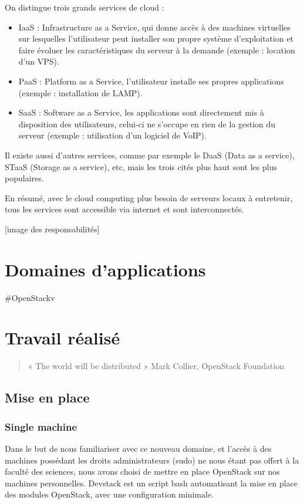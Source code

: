 \documentclass{report}
\begin{document}
    On distingue trois grands services de cloud :
    \begin{itemize}
        \item IaaS : Infrastructure as a Service, qui donne accès à des machines virtuelles sur lesquelles l'utilisateur peut installer son propre système d'exploitation et faire évoluer les caractéristiques du serveur à la demande (exemple : location d'un VPS).
        \item PaaS : Platform as a Service, l'utilisateur installe ses propres applications (exemple : installation de LAMP).
        \item SaaS : Software as a Service, les applications sont directement mis à disposition des utilisateurs, celui-ci ne s'occupe en rien de la gestion du serveur (exemple : utilisation d'un logiciel de VoIP).
    \end{itemize}
    \bigbreak
    
    Il existe aussi d'autres services, comme par exemple le DaaS (Data as a service), STaaS (Storage as a service), etc, mais les trois cités plus haut sont les plus populaires.\break
    
    En résumé, avec le cloud computing plus besoin de serveurs locaux à entretenir, tous les services sont accessible via internet et sont interconnectés.\break
    
    [image des responsabilités]


\newpage
\chapter{Domaines d'applications}
 #OpenStackv

\chapter{Travail réalisé}
    \begin{quote}
        « The world will be distributed » Mark Collier, OpenStack Foundation
    \end{quote}
    \bigbreak
    \section{Mise en place}
        \subsection{Single machine}
            Dans le but de nous familiariser avec ce nouveau domaine,
            et l'accès à des machines possédant les droits administrateurs (sudo)
            ne nous étant pas offert à la faculté des sciences,
            nous avons choisi de mettre en place OpenStack sur nos machines personnelles.\break
            Devstack est un script bash automatisant la mise en place des modules OpenStack, 
            avec une configuration minimale.
\end{document}
